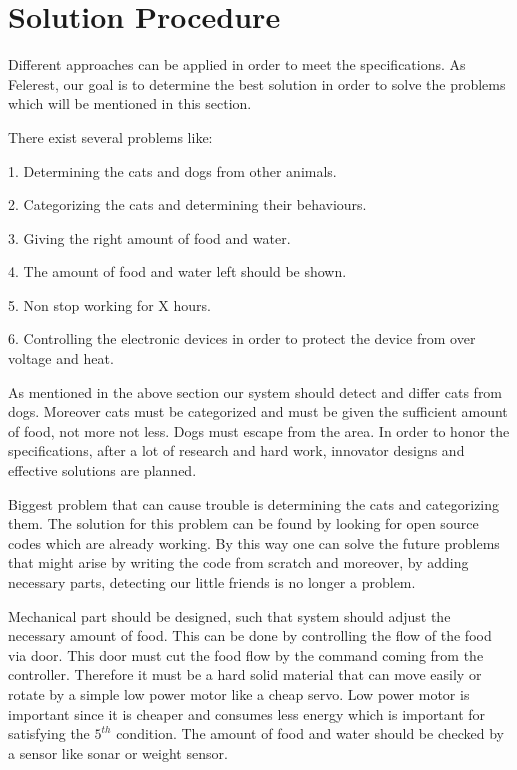 \section{Solution Procedure} \label{sec:sol_proc}


Different approaches can be applied in order to meet the specifications. As Felerest, our goal is to determine the best solution in order to solve the problems which will be mentioned in this section. 

There exist several problems like:

1. Determining the cats and dogs from other animals.

2. Categorizing the cats and determining their behaviours. 

3. Giving the right amount of food and water.

4. The amount of food and water left should be shown.

5. Non stop working for X hours.

6. Controlling the electronic devices in order to protect the device from over voltage and heat. 

As mentioned in the above section our system should detect and differ cats from dogs. Moreover cats must be categorized and must be given the sufficient amount of food, not more not less. Dogs must escape from the area. In order to honor the specifications, after a lot of research and hard work, innovator designs and effective solutions are planned.

Biggest problem that can cause trouble is determining the cats and categorizing them. The solution for this problem can be found by looking for open source codes which are already working. By this way one can solve the future problems that might arise by writing the code from scratch and moreover, by adding necessary parts, detecting our little friends is no longer a problem. 

Mechanical part should be designed, such that system should adjust the necessary amount of food. This can be done by controlling the flow of the food via door. This door must cut the food flow by the command coming from the controller. Therefore it must be a hard solid material that can move easily or rotate by a simple low power motor like a cheap servo\cite{cite:cheapservo}. Low power motor is important since it is cheaper and consumes less energy which is important for satisfying the \(5^{th}\) condition. The amount of food and water should be checked by a sensor like sonar or weight sensor. 

